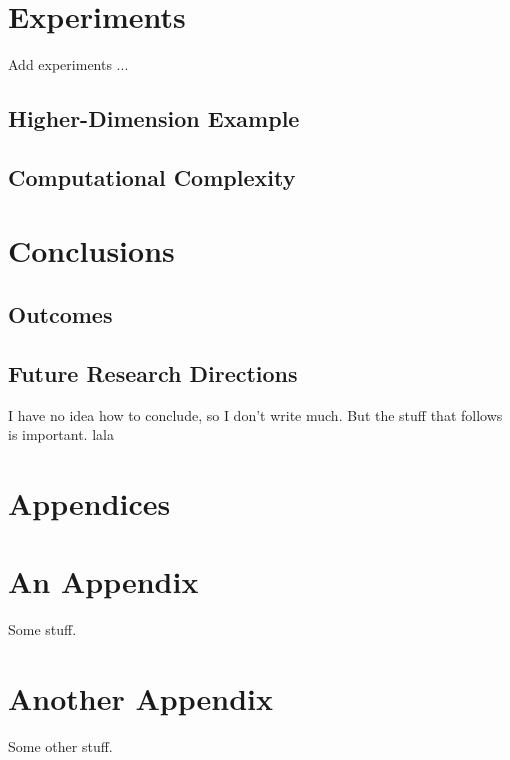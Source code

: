 \documentclass[11pt,twoside]{article}
\newtheorem{Proposition}{Proposition}
\numberwithin{Theorem}{section}
\numberwithin{Definition}{section}
\numberwithin{Lemma}{section}
\numberwithin{Algorithm}{section}
\numberwithin{equation}{section}
\begin{document}




\section{Experiments}
Add experiments ...

\subsection{Higher-Dimension Example}

\subsection{Computational Complexity}
\clearpage

\section{Conclusions}

\subsection{Outcomes}

\subsection{Future Research Directions}
I have no idea how to conclude, so I don't write much. But the stuff that follows is important. lala
\clearpage

\printbibliography
\clearpage

\appendix
\section*{Appendices}

\section{An Appendix}
\label{app:one}

Some stuff.
\clearpage

\section{Another Appendix}
\label{app:two}

Some other stuff.
\end{document}
